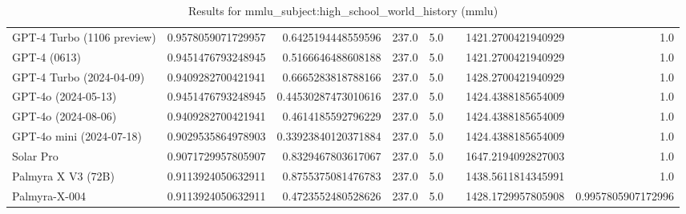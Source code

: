 \begin{table}[htp]
{\begin{tabular}{lrrrrrrr}
GPT-4 Turbo (1106 preview) & 0.9578059071729957 & 0.6425194448559596 & 237.0 & 5.0 &  & 1421.2700421940929 & 1.0 \\
GPT-4 (0613) & 0.9451476793248945 & 0.5166646488608188 & 237.0 & 5.0 &  & 1421.2700421940929 & 1.0 \\
GPT-4 Turbo (2024-04-09) & 0.9409282700421941 & 0.6665283818788166 & 237.0 & 5.0 &  & 1428.2700421940929 & 1.0 \\
GPT-4o (2024-05-13) & 0.9451476793248945 & 0.44530287473010616 & 237.0 & 5.0 &  & 1424.4388185654009 & 1.0 \\
GPT-4o (2024-08-06) & 0.9409282700421941 & 0.4614185592796229 & 237.0 & 5.0 &  & 1424.4388185654009 & 1.0 \\
GPT-4o mini (2024-07-18) & 0.9029535864978903 & 0.33923840120371884 & 237.0 & 5.0 &  & 1424.4388185654009 & 1.0 \\
Solar Pro & 0.9071729957805907 & 0.8329467803617067 & 237.0 & 5.0 &  & 1647.2194092827003 & 1.0 \\
Palmyra X V3 (72B) & 0.9113924050632911 & 0.8755375081476783 & 237.0 & 5.0 &  & 1438.5611814345991 & 1.0 \\
Palmyra-X-004 & 0.9113924050632911 & 0.4723552480528626 & 237.0 & 5.0 &  & 1428.1729957805908 & 0.9957805907172996 \\
\bottomrule
\end{tabular}}
\caption{Results for mmlu_subject:high_school_world_history (mmlu)}
\label{fig:mmlu_subject:high_school_world_history (mmlu)}
\end{table}